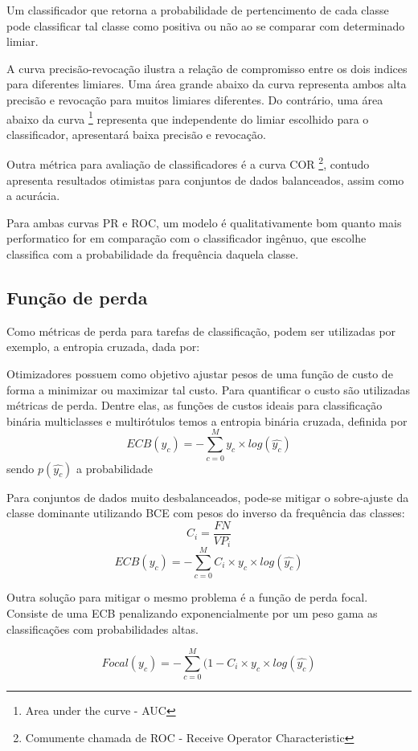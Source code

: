 Um classificador que retorna a probabilidade de pertencimento de cada classe pode classificar tal classe como positiva ou não ao se comparar com determinado limiar.

A curva precisão-revocação ilustra a relação de compromisso entre os dois indices para diferentes limiares. Uma área grande abaixo da curva representa ambos alta precisão e revocação para muitos limiares diferentes. Do contrário, uma área abaixo da curva \footnote[1]{Area under the curve - AUC} representa que independente do limiar escolhido para o classificador, apresentará baixa precisão e revocação.

Outra métrica para avaliação de classificadores é a curva COR \footnote[2]{Comumente chamada de ROC - Receive Operator Characteristic}, contudo apresenta resultados otimistas para conjuntos de dados balanceados, assim como a acurácia.

Para ambas curvas PR e ROC, um modelo é qualitativamente bom quanto mais performatico for em comparação com o classificador ingênuo, que escolhe classifica com a probabilidade da frequência daquela classe.

\subsection{Função de perda}\label{sec:cap2_fucao_de_perda}

Como métricas de perda para tarefas de classificação, podem ser utilizadas por exemplo, a entropia cruzada, dada por:

Otimizadores possuem como objetivo ajustar pesos de uma função de custo de forma a minimizar ou maximizar tal custo. Para quantificar o custo são utilizadas métricas de perda. Dentre elas, as funções de custos ideais para classificação binária multiclasses e multirótulos temos a entropia binária cruzada, definida por 
$$ECB(y_c) = -\sum_{c=0}^{M} y_c \times log(\hat{y_c})$$
sendo $p(\hat{y_c})$ a probabilidade 

Para conjuntos de dados muito desbalanceados, pode-se mitigar o sobre-ajuste da classe dominante utilizando BCE com pesos do inverso da frequência das classes:
$$ C_i = \frac{FN}{VP_i} $$
$$ECB(y_c) = -\sum_{c=0}^{M} C_i \times y_c \times log(\hat{y_c})$$


Outra solução para mitigar o mesmo problema é a função de perda focal. Consiste de uma ECB penalizando exponencialmente por um peso gama as classificações com probabilidades altas.

$$Focal(y_c) = -\sum_{c=0}^{M} (1-C_i \times y_c \times log(\hat{y_c})$$

